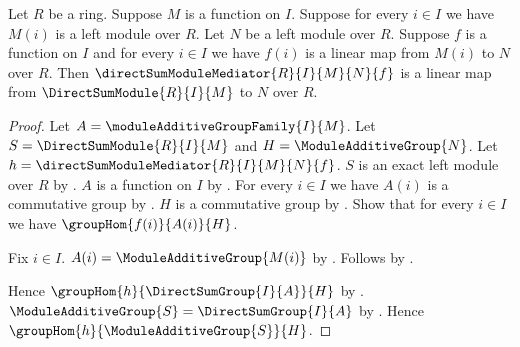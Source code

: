 \begin{theorem}\label{direct_sum_module_mediator_linear}
    Let $R$ be a ring.
    Suppose $M$ is a function on $I$.
    Suppose for every $i\in I$ we have $M(i)$ is a left module over $R$.
    Let $N$ be a left module over $R$.
    Suppose $f$ is a function on $I$ and for every $i\in I$ we have
        $f(i)$ is a linear map from $M(i)$ to $N$ over $R$.
    Then $\directSumModuleMediator{R}{I}{M}{N}{f}$ is a linear map from
        $\DirectSumModule{R}{I}{M}$ to $N$ over $R$.
\end{theorem}
\begin{proof}
    Let $A=\moduleAdditiveGroupFamily{I}{M}$.
    Let $S=\DirectSumModule{R}{I}{M}$ and
        $H=\ModuleAdditiveGroup{N}$.
    Let $h=\directSumModuleMediator{R}{I}{M}{N}{f}$.
    $S$ is an exact left module over $R$ by
        .
    $A$ is a function on $I$ by
        .
    For every $i\in I$ we have $A(i)$ is a commutative group by
        .
    $H$ is a commutative group by
        .
    Show that for every $i\in I$ we have $\groupHom{f(i)}{A(i)}{H}$.
    \begin{subproof}
        Fix $i\in I$.
        $A(i)=\ModuleAdditiveGroup{M(i)}$ by
            .
        Follows by .
    \end{subproof}
    Hence $\groupHom{h}{\DirectSumGroup{I}{A}}{H}$ by
        .
    $\ModuleAdditiveGroup{S}=\DirectSumGroup{I}{A}$ by
        .
    Hence $\groupHom{h}{\ModuleAdditiveGroup{S}}{H}$.


\end{proof}
